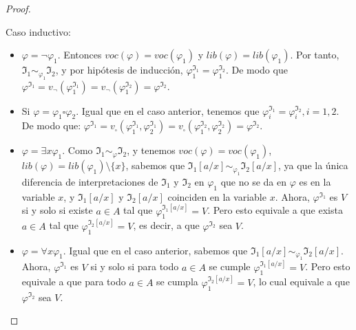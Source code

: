 \begin{proof}
\begin{enumerate}
\begin{itemize}
    \end{itemize}
    Caso inductivo:
    \begin{itemize}
        \item $\varphi=\neg\varphi_1$. Entonces $voc(\varphi)=voc(\varphi_1)$ y $lib(\varphi)=lib(\varphi_1)$. Por tanto, $\mathfrak{I}_{1} \sim_{\varphi_1} \mathfrak{I}_{2}$, y por hipótesis de inducción, $\varphi_1^{\mathfrak{I}_1}=\varphi_1^{\mathfrak{I}_2}$. De modo que
        $\varphi^{\mathfrak{I}_1}=v_\neg(\varphi_1^{\mathfrak{I}_1})=v_\neg(\varphi_1^{\mathfrak{I}_2})=\varphi^{\mathfrak{I}_2}$.
        
        \item Si $\varphi=\varphi_1\square\varphi_2$. Igual que en el caso anterior, tenemos que $\varphi_i^{\mathfrak{I}_1}=\varphi_i^{\mathfrak{I}_2},i=1,2$. De modo que:
        $\varphi^{\mathfrak{I}_1}=v_\square(\varphi_1^{\mathfrak{I}_1},\varphi_2^{\mathfrak{I}_1})=v_\square(\varphi_1^{\mathfrak{I}_2},\varphi_2^{\mathfrak{I}_2})=\varphi^{\mathfrak{I}_2}$.
        
        \item $\varphi=\exists x \varphi_1$. Como $\mathfrak{I}_{1} \sim_{\varphi} \mathfrak{I}_{2}$, y tenemos $voc(\varphi)=voc(\varphi_1)$, $lib(\varphi)=lib(\varphi_1)\setminus \{x\}$, sabemos que $\mathfrak{I}_1[a/x]\sim_{\varphi_1}\mathfrak{I}_2[a/x]$, ya que la única diferencia de interpretaciones de $\mathfrak{I}_1$ y $\mathfrak{I}_2$ en $\varphi_1$ que no se da en $\varphi$ es en la variable $x$, y $\mathfrak{I}_1[a/x]$ y $\mathfrak{I}_2[a/x]$ coinciden en la variable $x$. Ahora,
        $\varphi^{\mathfrak{I}_1}$ es $V$ si y solo si existe $a\in A$ tal que $\varphi_1^{\mathfrak{I}_1[a/x]} = V$. Pero esto equivale a que exista $a\in A$ tal que $\varphi_1^{\mathfrak{I}_2[a/x]} = V$, es decir, a que $\varphi^{\mathfrak{I}_2}$ sea $V$.
        
        \item $\varphi=\forall x \varphi_1$. Igual que en el caso anterior, sabemos que $\mathfrak{I}_1[a/x]\sim_{\varphi_1}\mathfrak{I}_2[a/x]$. Ahora,
        $\varphi^{\mathfrak{I}_1}$ es $V$ si y solo si para todo $a\in A$ se cumple $\varphi_1^{\mathfrak{I}_1[a/x]} = V$. Pero esto equivale a que para todo $a\in A$ se cumpla $\varphi_1^{\mathfrak{I}_2[a/x]} = V$, lo cual equivale a que $\varphi^{\mathfrak{I}_2}$ sea $V$.
    \end{itemize}
\end{enumerate}
\end{proof}

